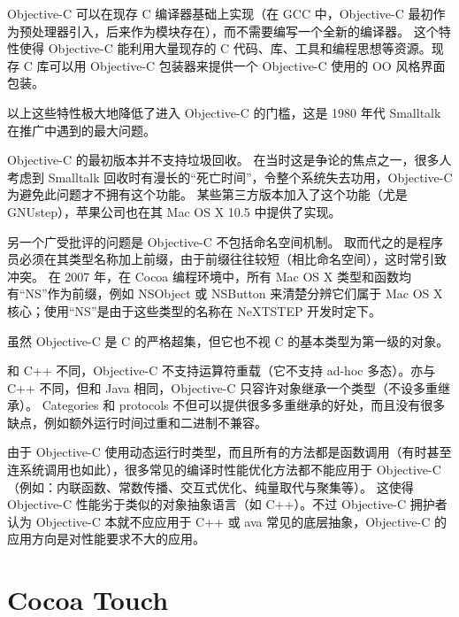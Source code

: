 Objective-C 可以在现存 C 编译器基础上实现（在 GCC 中，Objective-C 最初作为预处理器引入，后来作为模块存在），而不需要编写一个全新的编译器。
这个特性使得 Objective-C 能利用大量现存的 C 代码、库、工具和编程思想等资源。现存 C 库可以用 Objective-C 包装器来提供一个 Objective-C 使用的 OO 风格界面包装。

以上这些特性极大地降低了进入 Objective-C 的门槛，这是 1980 年代 Smalltalk 在推广中遇到的最大问题。

Objective-C 的最初版本并不支持垃圾回收。
在当时这是争论的焦点之一，很多人考虑到 Smalltalk 回收时有漫长的“死亡时间”，令整个系统失去功用，Objective-C 为避免此问题才不拥有这个功能。
某些第三方版本加入了这个功能（尤是 GNUstep），苹果公司也在其 Mac OS X 10.5 中提供了实现。

另一个广受批评的问题是 Objective-C 不包括命名空间机制。
取而代之的是程序员必须在其类型名称加上前缀，由于前缀往往较短（相比命名空间），这时常引致冲突。
在 2007 年，在 Cocoa 编程环境中，所有 Mac OS X 类型和函数均有“NS”作为前缀，例如 NSObject 或 NSButton 来清楚分辨它们属于 Mac OS X 核心；使用“NS”是由于这些类型的名称在 NeXTSTEP 开发时定下。

虽然 Objective-C 是 C 的严格超集，但它也不视 C 的基本类型为第一级的对象。

和 C++ 不同，Objective-C 不支持运算符重载（它不支持 ad-hoc 多态）。亦与 C++ 不同，但和 Java 相同，Objective-C 只容许对象继承一个类型（不设多重继承）。
Categories 和 protocols 不但可以提供很多多重继承的好处，而且没有很多缺点，例如额外运行时间过重和二进制不兼容。

由于 Objective-C 使用动态运行时类型，而且所有的方法都是函数调用（有时甚至连系统调用也如此），很多常见的编译时性能优化方法都不能应用于 Objective-C（例如：内联函数、常数传播、交互式优化、纯量取代与聚集等）。
这使得 Objective-C 性能劣于类似的对象抽象语言（如 C++）。不过 Objective-C 拥护者认为 Objective-C 本就不应应用于 C++ 或 ava 常见的底层抽象，Objective-C 的应用方向是对性能要求不大的应用。

\section{Cocoa Touch}

